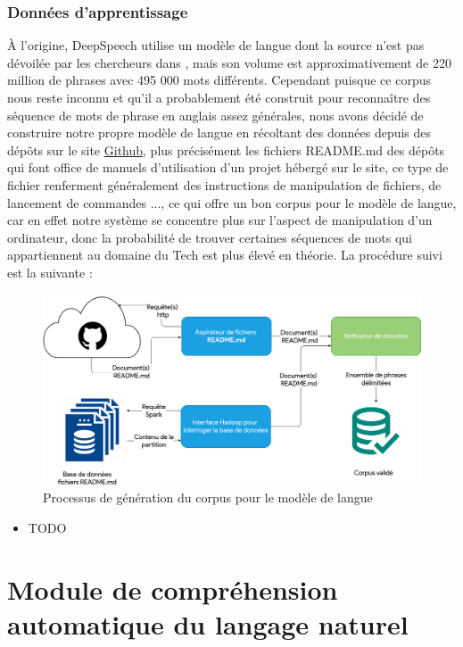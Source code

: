 		\subsubsection*{Données d'apprentissage}
		À l'origine, DeepSpeech utilise un modèle de langue dont la source n'est pas dévoilée par les chercheurs dans \cite{deepspeech_paper}, mais son volume est approximativement de 220 million de phrases avec 495 000 mots différents. Cependant puisque ce corpus nous reste inconnu et qu'il a probablement été construit pour reconnaître des séquence de mots de phrase en anglais assez générales, nous avons décidé de construire notre propre modèle de langue en récoltant des données depuis des dépôts sur le site \href{https://github.com/}{Github}, plus précisément les fichiers README.md des dépôts qui font office de manuels d'utilisation d'un projet hébergé sur le site, ce type de fichier renferment généralement des instructions de manipulation de fichiers, de lancement de commandes ..., ce qui offre un bon corpus pour le modèle de langue, car en effet notre système se concentre plus sur l'aspect de manipulation d'un ordinateur, donc la probabilité de trouver certaines séquences de mots qui appartiennent au domaine du Tech est plus élevé en théorie. La procédure suivi est la suivante : 
		\begin{figure}[H] 
			\label{lm_gathering}
			\centering
			\includegraphics[width=0.88\linewidth]{images/Conception/ASR/lm_gathering.png}
			\caption{Processus de génération du corpus pour le modèle de langue}
		\end{figure}
		
		\begin{itemize}
			\item TODO
		\end{itemize}
		

\section{Module de compréhension automatique du langage naturel }

